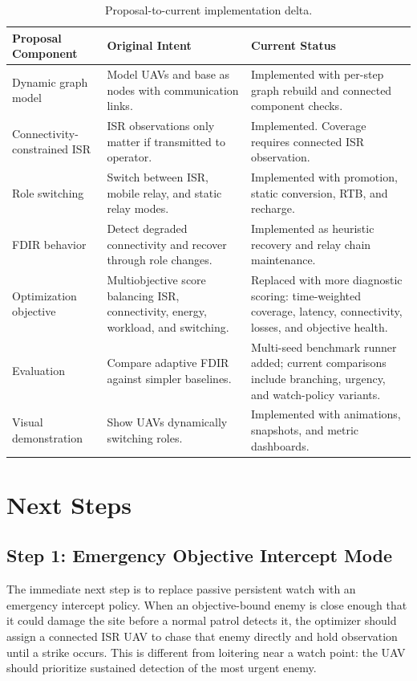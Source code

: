 \documentclass[conference]{IEEEtran}
\begin{document}
\begin{table}[t]
    \centering
    \caption{Proposal-to-current implementation delta.}
    \label{tab:proposal_delta}
    \begin{tabular}{p{} p{} p{}}
        \toprule
        Proposal Component & Original Intent & Current Status \\
        \midrule
        Dynamic graph model
        & Model UAVs and base as nodes with communication links.
        & Implemented with per-step graph rebuild and connected component checks. \\
        \addlinespace
        Connectivity-constrained ISR
        & ISR observations only matter if transmitted to operator.
        & Implemented. Coverage requires connected ISR observation. \\
        \addlinespace
        Role switching
        & Switch between ISR, mobile relay, and static relay modes.
        & Implemented with promotion, static conversion, RTB, and recharge. \\
        \addlinespace
        FDIR behavior
        & Detect degraded connectivity and recover through role changes.
        & Implemented as heuristic recovery and relay chain maintenance. \\
        \addlinespace
        Optimization objective
        & Multiobjective score balancing ISR, connectivity, energy, workload, and switching.
        & Replaced with more diagnostic scoring: time-weighted coverage, latency, connectivity, losses, and objective health. \\
        \addlinespace
        Evaluation
        & Compare adaptive FDIR against simpler baselines.
        & Multi-seed benchmark runner added; current comparisons include branching, urgency, and watch-policy variants. \\
        \addlinespace
        Visual demonstration
        & Show UAVs dynamically switching roles.
        & Implemented with animations, snapshots, and metric dashboards. \\
        \bottomrule
    \end{tabular}
\end{table}

\section{Next Steps}

\subsection{Step 1: Emergency Objective Intercept Mode}
The immediate next step is to replace passive persistent watch with an emergency
intercept policy. When an objective-bound enemy is close enough that it could
damage the site before a normal patrol detects it, the optimizer should assign a
connected ISR UAV to chase that enemy directly and hold observation until a
strike occurs. This is different from loitering near a watch point: the UAV
should prioritize sustained detection of the most urgent enemy.
\end{document}
